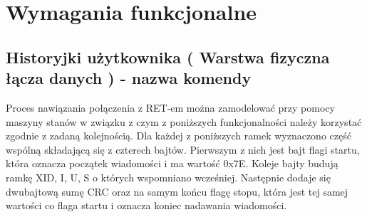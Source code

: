 \chapter{Wymagania funkcjonalne}
	\section{Historyjki użytkownika ( Warstwa fizyczna łącza danych ) - nazwa komendy}
		Proces nawiązania połączenia z RET-em można zamodelować przy pomocy maszyny stanów w związku z czym z poniższych funkcjonalności należy korzystać zgodnie z zadaną kolejnością.
		Dla każdej z poniższych ramek wyznaczono część wspólną składającą się z czterech bajtów. Pierwszym z nich jest bajt flagi startu, która oznacza początek wiadomości i ma wartość 0x7E.
		Koleje bajty budują ramkę XID, I, U, S o których wspomniano wcześniej. Następnie dodaje się dwubajtową sumę CRC oraz na samym końcu flagę stopu, która jest tej samej wartości co flaga startu i oznacza koniec nadawania wiadomości.

